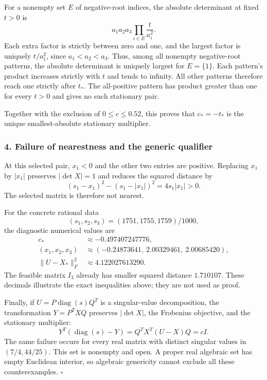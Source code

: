 \documentclass[10pt,a4paper]{article}
\begin{document}
For a nonempty set \(E\) of negative-root indices, the absolute
determinant at fixed \(t>0\) is \[
a_1a_2a_3\prod_{i\in E}\frac{t}{a_i^2}.
\] Each extra factor is strictly between zero and one, and the largest
factor is uniquely \(t/a_1^2\), since \(a_1<a_2<a_3\). Thus, among all
nonempty negative-root patterns, the absolute determinant is uniquely
largest for \(E=\{1\}\). Each pattern's product increases strictly with
\(t\) and tends to infinity. All other patterns therefore reach one
strictly after \(t_*\). The all-positive pattern has product greater
than one for every \(t>0\) and gives no such stationary pair.

Together with the exclusion of \(0\le c\le0.52\), this proves that
\(c_*=-t_*\) is the unique smallest-absolute stationary multiplier.

\subsubsection{4. Failure of nearestness and the generic
qualifier}\label{failure-of-nearestness-and-the-generic-qualifier}

At this selected pair, \(x_1<0\) and the other two entries are positive.
Replacing \(x_1\) by \(|x_1|\) preserves \(|\det X|=1\) and reduces the
squared distance by \[
(s_1-x_1)^2-(s_1-|x_1|)^2=4s_1|x_1|>0.
\] The selected matrix is therefore not nearest.

For the concrete rational data \[
(s_1,s_2,s_3)=(1751,1755,1759)/1000,
\] the diagnostic numerical values are \[
\begin{aligned}
c_*&\approx-0.497407247776,\\
(x_1,x_2,x_3)&\approx(-0.24873641,\ 2.00329461,\ 2.00685420),\\
\|U-X_*\|_F^2&\approx4.122027613290.
\end{aligned}
\] The feasible matrix \(I_3\) already has smaller squared distance
\(1.710107\). These decimals illustrate the exact inequalities above;
they are not used as proof.

Finally, if \(U=P\operatorname{diag}(s)Q^T\) is a singular-value
decomposition, the transformation \(Y=P^TXQ\) preserves \(|\det X|\),
the Frobenius objective, and the stationary multiplier: \[
Y^T(\operatorname{diag}(s)-Y)=Q^TX^T(U-X)Q=cI.
\] The same failure occurs for every real matrix with distinct singular
values in \((7/4,44/25)\). This set is nonempty and open. A proper real
algebraic set has empty Euclidean interior, so algebraic genericity
cannot exclude all these counterexamples. \(\square\)
\end{document}
